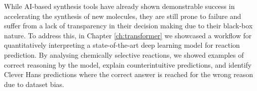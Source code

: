 



While AI-based synthesis tools have already shown demonstrable success in accelerating the synthesis of new molecules, they are still prone to failure and suffer from a lack of transparency in their decision making due to their black-box nature. To address this, in Chapter \ref{ch:transformer} we showcased a workflow for quantitatively interpreting a state-of-the-art deep learning model for reaction prediction. By analysing chemically selective reactions, we showed examples of correct reasoning by the model, explain counterintuitive predictions, and identify Clever Hans predictions where the correct answer is reached for the wrong reason due to dataset bias.

